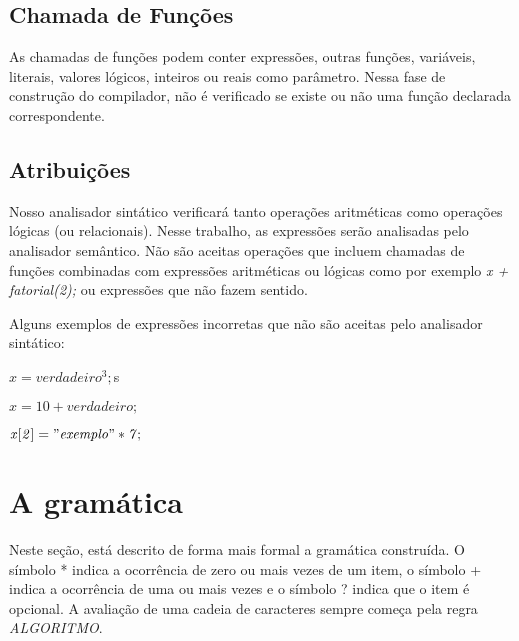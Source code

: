 \documentclass[
12pt,				%
a4paper,			%
english,			%
french,				%
spanish,			%
brazil,				%
article
]{abntex2}
\begin{document}
\subsection{Chamada de Funções}
As chamadas de funções podem conter expressões, outras funções, variáveis, literais, valores lógicos, inteiros ou reais como parâmetro. Nessa fase de construção do compilador, não é verificado se existe ou não uma função declarada correspondente.

\subsection{Atribuições}
\label{atribuicoes}
Nosso analisador sintático verificará tanto operações aritméticas como operações lógicas (ou relacionais). Nesse trabalho, as expressões serão analisadas pelo analisador semântico. Não são aceitas operações que incluem chamadas de funções combinadas com expressões aritméticas ou lógicas como por exemplo \textit{x + fatorial(2);} ou expressões que não fazem sentido.

Alguns exemplos de expressões incorretas que não são aceitas pelo analisador sintático:

\begin{math}
	\mathit{x = verdadeiro ^ 3;}
\end{math}s

\begin{math}
	\mathit{x = 10 + verdadeiro;}
\end{math}

\begin{math}
	\mathit{x[2] = "exemplo" * 7;}
\end{math}


\section{A gramática}
Neste seção, está descrito de forma mais formal a gramática construída. O símbolo * indica a ocorrência de zero ou mais vezes de um item, o símbolo + indica a ocorrência de uma ou mais vezes e o símbolo ? indica que o item é opcional.
A avaliação de uma cadeia de caracteres sempre começa pela regra \textit{ALGORITMO}.
\end{document}
